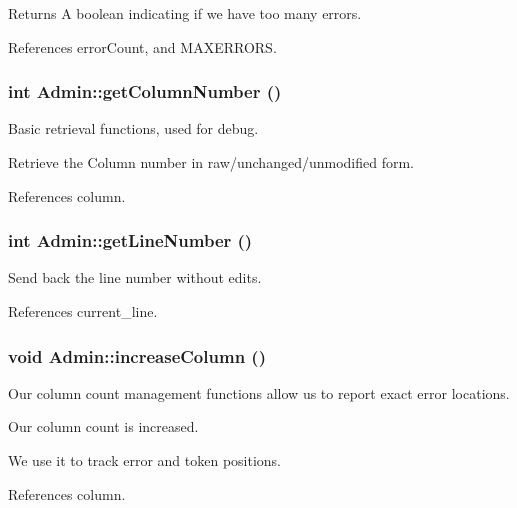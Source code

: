 \begin{DoxyReturn}{Returns}
A boolean indicating if we have too many errors. 
\end{DoxyReturn}


References errorCount, and MAXERRORS.

\hypertarget{classAdmin_a576e2dfe10f528ad5f1816e673ed2e32}{
\subsubsection[{getColumnNumber}]{\setlength{\rightskip}{0pt plus 5cm}int Admin::getColumnNumber ()}}
\label{classAdmin_a576e2dfe10f528ad5f1816e673ed2e32}


Basic retrieval functions, used for debug. 

Retrieve the Column number in raw/unchanged/unmodified form.

References column.

\hypertarget{classAdmin_a1a33282a2d64fa3dd9b3e8ac1a4799e3}{
\subsubsection[{getLineNumber}]{\setlength{\rightskip}{0pt plus 5cm}int Admin::getLineNumber ()}}
\label{classAdmin_a1a33282a2d64fa3dd9b3e8ac1a4799e3}


Send back the line number without edits. 



References current\_\-line.

\hypertarget{classAdmin_a89653dd68c51b51d9003a2518a56175f}{
\subsubsection[{increaseColumn}]{\setlength{\rightskip}{0pt plus 5cm}void Admin::increaseColumn ()}}
\label{classAdmin_a89653dd68c51b51d9003a2518a56175f}


Our column count management functions allow us to report exact error locations. 

Our column count is increased.

We use it to track error and token positions. 

References column.

